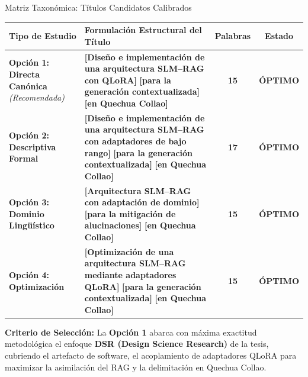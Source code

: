 \documentclass[aspectratio=169, 10pt, spanish]{beamer}
\begin{document}
\begin{frame}{Matriz Taxonómica: Títulos Candidatos Calibrados}
    \vspace{-0.3cm}
    \begin{center}
    \tiny
    \begin{tabular}{p{2.3cm} p{8.2cm} c c}
        \toprule
        \textbf{\color{bpNavy}Tipo de Estudio} & \textbf{\color{bpNavy}Formulación Estructural del Título} & \textbf{\color{bpNavy}Palabras} & \textbf{\color{bpNavy}Estado} \\
        \midrule
        \textbf{Opción 1: Directa Canónica} \textit{(Recomendada)} & 
        \textbf{\color{bpBlue}[Diseño e implementación de una arquitectura SLM--RAG con QLoRA]} \textbf{\color{bpGold!90!black}[para la generación contextualizada]} \textbf{\color{bpRust}[en Quechua Collao]} & 
        \textbf{15} & \color{bpGreen}\textbf{ÓPTIMO} \\
        \addlinespace[0.12cm]
        \textbf{Opción 2: Descriptiva Formal} & 
        \textbf{\color{bpBlue}[Diseño e implementación de una arquitectura SLM--RAG con adaptadores de bajo rango]} \textbf{\color{bpGold!90!black}[para la generación contextualizada]} \textbf{\color{bpRust}[en Quechua Collao]} & 
        \textbf{17} & \color{bpGreen}\textbf{ÓPTIMO} \\
        \addlinespace[0.12cm]
        \textbf{Opción 3: Dominio Lingüístico} & 
        \textbf{\color{bpBlue}[Arquitectura SLM--RAG con adaptación de dominio]} \textbf{\color{bpGold!90!black}[para la mitigación de alucinaciones]} \textbf{\color{bpRust}[en Quechua Collao]} & 
        \textbf{15} & \color{bpGreen}\textbf{ÓPTIMO} \\
        \addlinespace[0.12cm]
        \textbf{Opción 4: Optimización} & 
        \textbf{\color{bpBlue}[Optimización de una arquitectura SLM--RAG mediante adaptadores QLoRA]} \textbf{\color{bpGold!90!black}[para la generación contextualizada]} \textbf{\color{bpRust}[en Quechua Collao]} & 
        \textbf{15} & \color{bpGreen}\textbf{ÓPTIMO} \\
        \bottomrule
    \end{tabular}
    \end{center}

    \vspace{0.15cm}
    \begin{tcolorbox}[colback=bpLightGray, colframe=bpBlue!50!black, arc=1.2mm, left=2mm, right=2mm, top=1.5mm, bottom=1.5mm]
        \tiny\textbf{\color{bpNavy}Criterio de Selección:}
        La \textbf{Opción 1} abarca con máxima exactitud metodológica el enfoque \textbf{DSR (Design Science Research)} de la tesis, cubriendo el artefacto de software, el acoplamiento de adaptadores QLoRA para maximizar la asimilación del RAG y la delimitación en Quechua Collao.
    \end{tcolorbox}
\end{frame}
\end{document}
